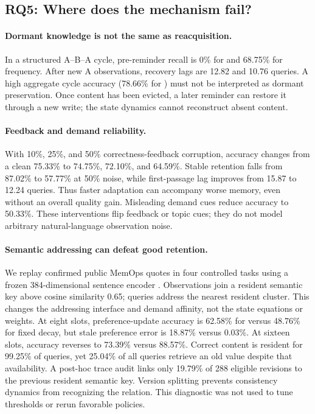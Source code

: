 \subsection{RQ5: Where does the mechanism fail?}
\paragraph{Dormant knowledge is not the same as reacquisition.}
In a structured A--B--A cycle, pre-reminder recall is 0\% for \ame and 68.75\% for frequency. After new A observations, recovery lags are 12.82 and 10.76 queries. A high aggregate cycle accuracy (78.66\% for \ame) must not be interpreted as dormant preservation. Once content has been evicted, a later reminder can restore it through a new write; the state dynamics cannot reconstruct absent content.

\paragraph{Feedback and demand reliability.}
With 10\%, 25\%, and 50\% correctness-feedback corruption, \ame accuracy changes from a clean 75.33\% to 74.75\%, 72.10\%, and 64.59\%. Stable retention falls from 87.02\% to 57.77\% at 50\% noise, while first-passage lag improves from 15.87 to 12.24 queries. Thus faster adaptation can accompany worse memory, even without an overall quality gain. Misleading demand cues reduce accuracy to 50.33\%. These interventions flip feedback or topic cues; they do not model arbitrary natural-language observation noise.

\paragraph{Semantic addressing can defeat good retention.}
We replay confirmed public MemOps quotes in four controlled tasks using a frozen 384-dimensional sentence encoder \citep{memops,minilm,sentenceencoder}. Observations join a resident semantic key above cosine similarity 0.65; queries address the nearest resident cluster. This changes the addressing interface and demand affinity, not the state equations or weights. At eight slots, preference-update accuracy is 62.58\% for \ame versus 48.76\% for fixed decay, but stale preference error is 18.87\% versus 0.03\%. At sixteen slots, accuracy reverses to 73.39\% versus 88.57\%. Correct content is resident for 99.25\% of \ame queries, yet 25.04\% of all queries retrieve an old value despite that availability. A post-hoc trace audit links only 19.79\% of 288 eligible revisions to the previous resident semantic key. Version splitting prevents consistency dynamics from recognizing the relation. This diagnostic was not used to tune thresholds or rerun favorable policies.

